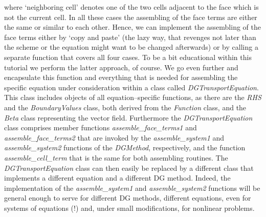 \documentclass[11pt]{article}
\begin{document}
where `neighboring cell' denotes one of the two cells adjacent to the
face which is not the current cell. In all these cases the assembling
of the face terms are either the same or similar to each other. Hence,
we can implement the assembling of the face terms either by `copy and
paste' (the lazy way, that revenges not later than the scheme or the
equation might want to be changed afterwards) or by calling a separate
function that covers all four cases. To be a bit educational within
this tutorial we perform the latter approach, of course. We go even
further and encapsulate this function and everything that is needed
for assembling the specific equation under consideration within a
class called \emph{DGTransportEquation}. This class includes objects
of all equation--specific functions, as there are the \emph{RHS} and
the \emph{BoundaryValues} class, both derived from the \emph{Function}
class, and the \emph{Beta} class representing the vector field.
Furthermore the \emph{DGTransportEquation} class comprises member
functions \emph{assemble\_face\_terms1} and
\emph{assemble\_face\_terms2} that are invoked by the
\emph{assemble\_system1} and \emph{assemble\_system2} functions of the
\emph{DGMethod}, respectively, and the function
\emph{assemble\_cell\_term} that is the same for both assembling
routines.  The \emph{DGTransportEquation} class can then easily be
replaced by a different class that implements a different equation and
a different DG method. Indeed, the implementation of the
\emph{assemble\_system1} and \emph{assemble\_system2} functions will
be general enough to serve for different DG methods, different
equations, even for systems of equations (!) and, under small
modifications, for nonlinear problems.
\end{document}
